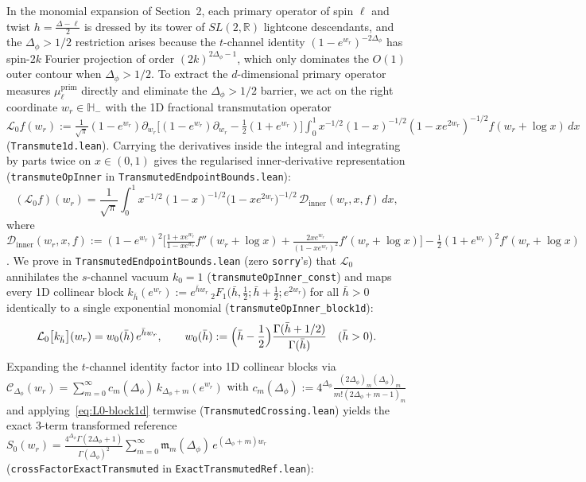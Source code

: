 \documentclass[10pt,a4paper]{article}
\theoremstyle{definition}
\begin{document}
In the monomial expansion of Section~2, each primary operator of spin $\ell$ and twist $h = \frac{\Delta - \ell}{2}$ is dressed by its tower of $SL(2, \mathbb{R})$ lightcone descendants, and the $\Delta_\phi > 1/2$ restriction arises because the $t$-channel identity $(1 - e^{w_r})^{-2\Delta_\phi}$ has spin-$2k$ Fourier projection of order $(2k)^{2\Delta_\phi - 1}$, which only dominates the $O(1)$ outer contour when $\Delta_\phi > 1/2$. To extract the $d$-dimensional primary operator measures $\mu^{\mathrm{prim}}_\ell$ directly and eliminate the $\Delta_\phi > 1/2$ barrier, we act on the right coordinate $w_r \in \mathbb{H}_-$ with the 1D fractional transmutation operator $\mathcal{L}_0 f(w_r) := \frac{1}{\sqrt{\pi}}(1 - e^{w_r})\partial_{w_r}\bigl[(1 - e^{w_r})\partial_{w_r} - \tfrac{1}{2}(1 + e^{w_r})\bigr] \int_0^1 x^{-1/2}(1-x)^{-1/2}(1 - x e^{2 w_r})^{-1/2} f(w_r + \log x)\, dx$ (\texttt{Transmute1d.lean}). Carrying the derivatives inside the integral and integrating by parts twice on $x \in (0, 1)$ gives the regularised inner-derivative representation (\texttt{transmuteOpInner} in \texttt{TransmutedEndpointBounds.lean}):
\begin{equation}
  \label{eq:L0-def}
  (\mathcal{L}_0 f)(w_r) = \frac{1}{\sqrt{\pi}} \int_0^1 x^{-1/2}(1 - x)^{-1/2}\bigl(1 - x e^{2 w_r}\bigr)^{-1/2} \, \mathcal{D}_{\mathrm{inner}}(w_r, x, f) \, dx,
\end{equation}
where $\mathcal{D}_{\mathrm{inner}}(w_r, x, f) := (1 - e^{w_r})^2 \bigl[\frac{1 + x e^{w_r}}{1 - x e^{w_r}} f''(w_r + \log x) + \frac{2 x e^{w_r}}{(1 - x e^{w_r})^2} f'(w_r + \log x)\bigr] - \frac{1}{2}(1 + e^{w_r})^2 f'(w_r + \log x)$.
We prove in \texttt{TransmutedEndpointBounds.lean} (zero \texttt{sorry}'s) that $\mathcal{L}_0$ annihilates the $s$-channel vacuum $k_0 = 1$ (\texttt{transmuteOpInner\_const}) and maps every 1D collinear block $k_{\bar{h}}(e^{w_r}) := e^{\bar{h} w_r} \, {}_2F_1\bigl(\bar{h}, \tfrac{1}{2}; \bar{h} + \tfrac{1}{2}; e^{2 w_r}\bigr)$ for all $\bar{h} > 0$ identically to a single exponential monomial (\texttt{transmuteOpInner\_block1d}):
\begin{equation}
  \label{eq:L0-block1d}
  \mathcal{L}_0\bigl[k_{\bar{h}}\bigr](w_r) = w_0(\bar{h}) \, e^{\bar{h} w_r}, \qquad
  w_0(\bar{h}) := \Bigl(\bar{h} - \frac{1}{2}\Bigr) \frac{\Gamma(\bar{h} + 1/2)}{\Gamma(\bar{h})} \quad (\bar{h} > 0).
\end{equation}
Expanding the $t$-channel identity factor into 1D collinear blocks via $\mathcal{C}_{\Delta_\phi}(w_r) = \sum_{m=0}^\infty c_m(\Delta_\phi) \, k_{\Delta_\phi + m}(e^{w_r})$ with $c_m(\Delta_\phi) := 4^{\Delta_\phi} \frac{(2\Delta_\phi)_m (\Delta_\phi)_m}{m! (2\Delta_\phi + m - 1)_m}$ and applying~\eqref{eq:L0-block1d} termwise (\texttt{TransmutedCrossing.lean}) yields the exact 3-term transformed reference $S_0(w_r) = \frac{4^{\Delta_\phi} \Gamma(2\Delta_\phi + 1)}{\Gamma(\Delta_\phi)^2} \sum_{m=0}^\infty \mathfrak{m}_m(\Delta_\phi) \, e^{(\Delta_\phi + m) w_r}$ (\texttt{crossFactorExactTransmuted} in \texttt{ExactTransmutedRef.lean}):
\end{document}
